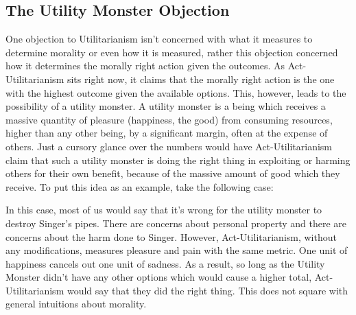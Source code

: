 \subsection{The Utility Monster Objection}

One objection to Utilitarianism isn't concerned with what it measures to determine morality or even how it is measured, rather this objection concerned how it determines the morally right action given the outcomes. As Act-Utilitarianism sits right now, it claims that the morally right action is the one with the highest outcome given the available options. This, however, leads to the possibility of a utility monster. A utility monster is a being which receives a massive quantity of pleasure (happiness, the good) from consuming resources, higher than any other being, by a significant margin, often at the expense of others. Just a cursory glance over the numbers would have Act-Utilitarianism claim that such a utility monster is doing the right thing in exploiting or harming others for their own benefit, because of the massive amount of good which they receive. To put this idea as an example, take the following case:


In this case, most of us would say that it's wrong for the utility monster to destroy Singer's pipes. There are concerns about personal property and there are concerns about the harm done to Singer. However, Act-Utilitarianism, without any modifications, measures pleasure and pain with the same metric. One unit of happiness cancels out one unit of sadness. As a result, so long as the Utility Monster didn't have any other options which would cause a higher total, Act-Utilitarianism would say that they did the right thing. This does not square with general intuitions about morality. 

